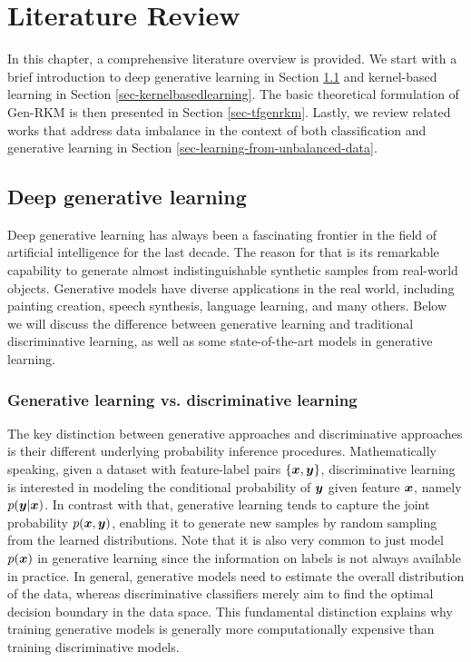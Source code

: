 \chapter{Literature Review}
\label{chap-lr}
In this chapter, a comprehensive literature overview is provided. We start with a brief introduction to deep generative learning in Section \ref{sec-Deepgenerativelearning} and kernel-based learning in Section \ref{sec-kernelbasedlearning}. The basic theoretical formulation of Gen-RKM is then presented in Section \ref{sec-tfgenrkm}. Lastly, we review related works that address data imbalance in the context of both classification and generative learning in Section \ref{sec-learning-from-unbalanced-data}.
\section{Deep generative learning}
\label{sec-Deepgenerativelearning}
Deep generative learning has always been a fascinating frontier in the field of artificial intelligence for the last decade. The reason for that is its remarkable capability to generate almost indistinguishable synthetic samples from real-world objects. Generative models have diverse applications in the real world,  including painting creation, speech synthesis, language learning, and many others. Below we will discuss the difference between generative learning and traditional discriminative learning, as well as some state-of-the-art models in generative learning.

\subsection{Generative learning vs. discriminative learning}
\label{subsec-Generativelearningvsdiscriminativelearning}
The key distinction between generative approaches and discriminative approaches is their different underlying probability inference procedures. Mathematically speaking, given a dataset with feature-label pairs $\{\boldsymbol{x},\boldsymbol{y}\}$, discriminative learning is interested in modeling the conditional probability of $\boldsymbol{y}$ given feature $\boldsymbol{x}$, namely $p(\boldsymbol{y}|\boldsymbol{x})$. In contrast with that, generative learning tends to capture the joint probability $p(\boldsymbol{x},\boldsymbol{y})$, enabling it to generate new samples by random sampling from the learned distributions. Note that it is also very common to just model $p(\boldsymbol{x})$ in generative learning since the information on labels is not always available in practice. In general, generative models need to estimate the overall distribution of the data, whereas discriminative classifiers merely aim to find the optimal decision boundary in the data space. This fundamental distinction explains why training generative models is generally more computationally expensive than training discriminative models.


